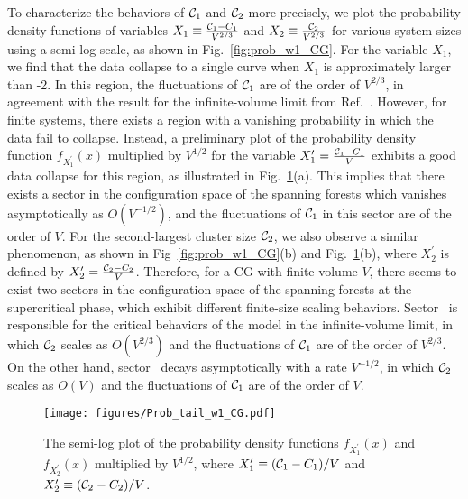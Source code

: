 To characterize the behaviors of ${\mathcal C}_1$ and ${\mathcal C}_2$ more precisely, we plot the probability density functions
of variables $X_1 \equiv \frac{{\mathcal C}_1 - C_1}{V^{2/3}}$ and $X_2 \equiv \frac{{\mathcal C}_2}{V^{2/3}}$ for various system sizes using a semi-log scale,
as shown in Fig.~\ref{fig:prob_w1_CG}. For the variable $X_1$, we find that the data collapse to a single curve when $X_1$ is approximately larger
than -2. In this region, the fluctuations of ${\mathcal C}_1$ are of the order of $V^{2/3}$, in agreement with the result for the infinite-volume limit from Ref.~.
However, for finite systems, there exists a region with a vanishing probability in which the data fail to collapse. Instead, a preliminary plot of the 
probability density function $f_{X_1^\prime}(x)$ multiplied by $V^{1/2}$ for the variable $X_1^\prime = \frac{{\mathcal C}_1 - C_1}{V}$ exhibits a good data collapse for this region, 
as illustrated in Fig.~\ref{fig:prob_w1_CG_tail}(a). This implies that there exists a sector in the configuration space of the spanning forests which vanishes
asymptotically as $O(V^{-1/2})$, and the fluctuations of ${\mathcal C}_1$ in this sector are of the order of $V$. 
For the second-largest cluster size ${\mathcal C}_2$, we also observe a similar phenomenon, as shown in Fig~\ref{fig:prob_w1_CG}(b) 
and Fig.~\ref{fig:prob_w1_CG_tail}(b), where $X_2^\prime$ is defined by $X_2^\prime = \frac{{\mathcal C}_2 - C_2}{V}$. 
Therefore, for a CG with finite volume $V$, there seems to exist two sectors in the configuration space of the spanning forests at the supercritical phase, which exhibit different finite-size scaling behaviors. 
Sector~ is responsible for the critical behaviors of the model in the infinite-volume limit, in which ${\mathcal C}_2$ scales as $O(V^{2/3})$ and the fluctuations of 
${\mathcal C}_1$ are of the order of $V^{2/3}$. On the other hand, sector~ decays asymptotically with a rate $V^{-1/2}$, in which ${\mathcal C}_2$ scales
as $O(V)$ and the fluctuations of ${\mathcal C}_1$ are of the order of $V$.

\begin{figure}[htb]
	\centering
	\texttt{[image: figures/Prob\_tail\_w1\_CG.pdf]}
	\caption{The semi-log plot of the probability density functions $f_{X_1^\prime}(x)$ and $f_{X_2^\prime}(x)$ multiplied by $V^{1/2}$,
	where $X_1^\prime \equiv ({\mathcal C}_1 - C_1)/V$ and $X_2^\prime \equiv ({\mathcal C}_2-C_2)/V$.}
	\label{fig:prob_w1_CG_tail}
\end{figure}

